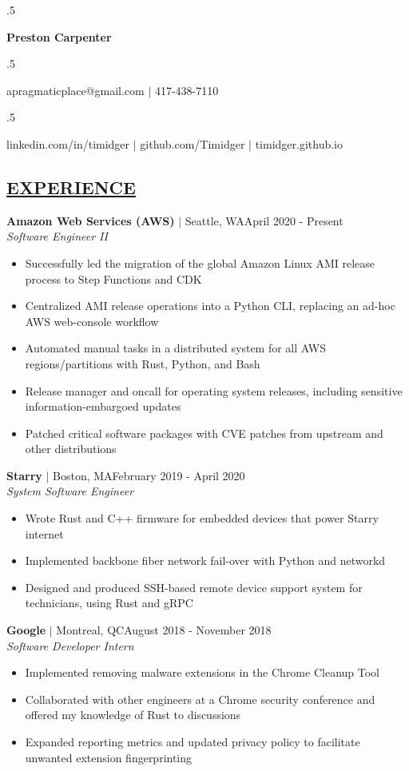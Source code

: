 \documentclass[overlapped,line]{res}
\begin{document}
\moveleft.5\hoffset\centerline{\huge\bf Preston Carpenter}
\vspace{.2em}

\moveleft.5\hoffset\centerline{apragmaticplace@gmail.com $|$ 417-438-7110}
\moveleft.5\hoffset\centerline{linkedin.com/in/timidger $|$ github.com/Timidger $|$ timidger.github.io }
\vspace{1em}

\begin{resume}

\section{\underline{EXPERIENCE}}

\textbf{Amazon Web Services (AWS)} $|$ Seattle, WA\hfill April 2020 - Present\\
{\sl Software Engineer II}
\begin{itemize} \itemsep -2pt
	\item Successfully led the migration of the global Amazon Linux AMI 
		release process to Step Functions and CDK
	\item Centralized AMI release operations into a
		Python CLI, replacing an ad-hoc AWS web-console workflow
	\item Automated manual tasks in a distributed
		system for all AWS regions/partitions with
		Rust, Python, and Bash
	\item Release manager and oncall for operating system releases,
		including sensitive information-embargoed updates
	\item Patched critical software packages with CVE patches from
		upstream and other distributions
\end{itemize}

\textbf{Starry} $|$ Boston, MA\hfill February 2019 - April 2020\\
{\sl System Software Engineer}
\begin{itemize} \itemsep -2pt
    \item Wrote Rust and C++ firmware for embedded devices that power Starry internet
    \item Implemented backbone fiber network fail-over with Python and networkd
    \item Designed and produced SSH-based remote device support system for technicians, using Rust and gRPC
\end{itemize}

\textbf{Google} $|$ Montreal, QC\hfill August 2018 - November 2018\\
{\sl Software Developer Intern}
\begin{itemize} \itemsep -2pt
	\item Implemented removing malware extensions in the Chrome Cleanup
		Tool%
    \item Collaborated with other engineers at a Chrome security conference and
      offered my knowledge of Rust to discussions
    \item Expanded reporting metrics and updated privacy policy to facilitate unwanted extension fingerprinting
\end{itemize}


\end{resume}
\end{document}
